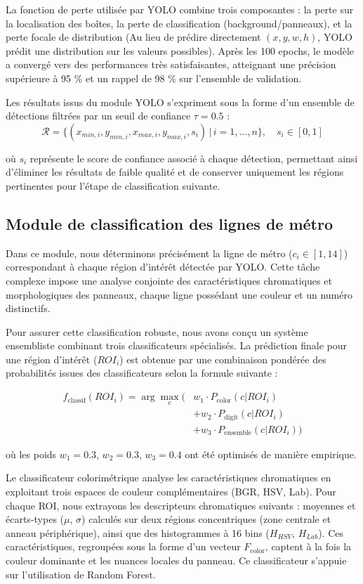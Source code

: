 \documentclass[journal]{IEEEtran}
\begin{document}
La fonction de perte utilisée par YOLO combine trois composantes : la perte sur la localisation des boîtes, la perte de classification (background/panneaux), et la perte focale de distribution (Au lieu de prédire directement $(x,y,w,h)$, YOLO prédit une distribution sur les valeurs possibles). Après les 100 epochs, le modèle a convergé vers des performances très satisfaisantes, atteignant une précision supérieure à 95 \% et un rappel de 98 \% sur l'ensemble de validation.

Les résultats issus du module YOLO s'expriment sous la forme d'un ensemble de détections filtrées par un seuil de confiance $\tau = 0.5$ :
$$\scriptstyle \mathcal{R} = \{(x_{min,i}, y_{min,i}, x_{max,i}, y_{max,i}, s_i)\,|\,i=1,...,n\}, \quad s_i \in [0,1]$$

où $s_i$ représente le score de confiance associé à chaque détection, permettant ainsi d'éliminer les résultats de faible qualité et de conserver uniquement les régions pertinentes pour l'étape de classification suivante.

\subsection{Module de classification des lignes de métro}

Dans ce module, nous déterminons précisément la ligne de métro ($c_i \in [1,14]$) correspondant à chaque région d'intérêt détectée par YOLO. Cette tâche complexe impose une analyse conjointe des caractéristiques chromatiques et morphologiques des panneaux, chaque ligne possédant une couleur et un numéro distinctifs.

Pour assurer cette classification robuste, nous avons conçu un système ensembliste combinant trois classificateurs spécialisés. La prédiction finale pour une région d'intérêt ($ROI_i$) est obtenue par une combinaison pondérée des probabilités issues des classificateurs selon la formule suivante :

$$\begin{aligned}
f_{\text{classif}}(ROI_i) = \arg\max_c \Big(&w_1 \cdot P_{\text{color}}(c|ROI_i) \\
&+ w_2 \cdot P_{\text{digit}}(c|ROI_i) \\
&+ w_3 \cdot P_{\text{ensemble}}(c|ROI_i)\Big)
\end{aligned}$$

où les poids $w_1 = 0.3$, $w_2 = 0.3$, $w_3 = 0.4$ ont été optimisés de manière empirique.

Le classificateur colorimétrique analyse les caractéristiques chromatiques en exploitant trois espaces de couleur complémentaires (BGR, HSV, Lab). Pour chaque ROI, nous extrayons les descripteurs chromatiques suivants : moyennes et écarts-types ($\mu$, $\sigma$) calculés sur deux régions concentriques (zone centrale et anneau périphérique), ainsi que des histogrammes à 16 bins ($H_{HSV}$, $H_{Lab}$). Ces caractéristiques, regroupées sous la forme d'un vecteur $F_{\text{color}}$, captent à la fois la couleur dominante et les nuances locales du panneau. Ce classificateur s'appuie sur l'utilisation de Random Forest.
\end{document}
